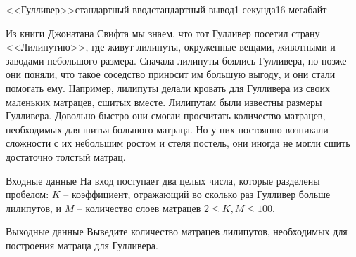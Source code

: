 \begin{problem}{<<Гулливер>>}{стандартный ввод}{стандартный вывод}{1 секунда}{16 мегабайт}

Из книги Джонатана Свифта мы знаем, что тот Гулливер посетил страну <<Лилипутию>>, где живут лилипуты, окруженные вещами, животными и заводами небольшого размера. Сначала лилипуты боялись Гулливера, но позже они поняли, что такое соседство приносит им большую выгоду, и они стали помогать ему. Например, лилипуты делали кровать для Гулливера из своих маленьких матрацев, сшитых вместе. Лилипутам были известны размеры Гулливера. Довольно быстро они смогли просчитать количество матрацев, необходимых для шитья большого матраца. Но у них постоянно возникали сложности с их небольшим ростом и стеля постель, они иногда не могли сшить достаточно толстый матрац.

\InputFile
Входные данные
На вход поступает два целых числа, которые разделены пробелом: $K$ -- коэффициент, отражающий во сколько раз Гулливер больше лилипутов, и $M$ -- количество слоев матрацев $2 \le K, M \le 100$.

\OutputFile
Выходные данные
Выведите количество матрацев лилипутов, необходимых для построения матраца для Гулливера.

\Example

\begin{example}
%
\end{example}

\end{problem}

